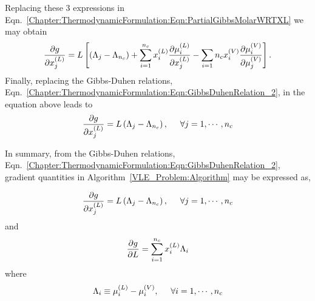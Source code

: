 Replacing these 3 expressions in Eqn.~\ref{Chapter:ThermodynamicFormulation:Eqn:PartialGibbsMolarWRTXL} we may obtain
\begin{equation}
    \frc{\partial g}{\partial\mfr[x]{j}{L}} = L\left[\left(\Lambda_{j}-\Lambda_{n_{c}}\right) + \summation_{i=1}^{n_{c}}\mfr[x]{i}{L}\frc{\partial\mfr[\mu]{i}{L}}{\partial\mfr[x]{j}{L}} - \summation_{i=1}{n_{c}}\mfr[x]{i}{V}\frc{\partial\mfr[\mu]{i}{V}}{\partial\mfr[\mu]{j}{V}}\right].
\end{equation}
Finally, replacing the Gibbs-Duhen relations, Eqn.~\ref{Chapter:ThermodynamicFormulation:Eqn:GibbsDuhenRelation_2}, in the equation above leads to
   \begin{equation}
        \frc{\partial g}{\partial\mfr[x]{j}{L}} = L\left(\Lambda_{j}-\Lambda_{n_{c}}\right), \hspace{.5cm} \forall j=1, \cdots, n_{c} \label{Chapter:ThermodynamicFormulation:Eqn:PartialGibbsMolarWRTXL_2}
   \end{equation}

In summary, from the Gibbs-Duhen relations, Eqn.~\ref{Chapter:ThermodynamicFormulation:Eqn:GibbsDuhenRelation_2}, gradient quantities in Algorithm~\ref{VLE_Problem:Algorithm} may be expressed as,

\begin{shaded}

\begin{displaymath}
 \frc{\partial g}{\partial\mfr[x]{j}{L}} = L\left(\Lambda_{j}-\Lambda_{n_{c}}\right), \hspace{0.5cm} \forall j=1, \cdots, n_{c}
\end{displaymath}
and
\begin{displaymath}
 \frc{\partial g}{\partial L} = \summation_{i=1}^{n_{c}}\mfr[x]{i}{L}\Lambda_{i}
\end{displaymath}
where
\begin{displaymath}
   \Lambda_{i} \equiv \mfr[\mu]{i}{L} - \mfr[\mu]{i}{V}, \hspace{.5cm} \forall i=1, \cdots, n_{c}
\end{displaymath}

\end{shaded}



